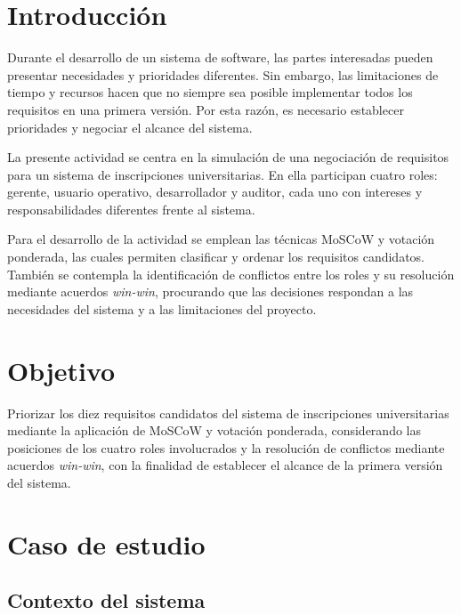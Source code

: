 \documentclass[12pt,a4paper]{article}
\begin{document}
\section{Introducción}

Durante el desarrollo de un sistema de software, las partes
interesadas pueden presentar necesidades y prioridades
diferentes. Sin embargo, las limitaciones de tiempo y recursos
hacen que no siempre sea posible implementar todos los
requisitos en una primera versión. Por esta razón, es necesario
establecer prioridades y negociar el alcance del sistema.

La presente actividad se centra en la simulación de una
negociación de requisitos para un sistema de inscripciones
universitarias. En ella participan cuatro roles: gerente,
usuario operativo, desarrollador y auditor, cada uno con
intereses y responsabilidades diferentes frente al sistema.

Para el desarrollo de la actividad se emplean las técnicas
MoSCoW y votación ponderada, las cuales permiten clasificar
y ordenar los requisitos candidatos. También se contempla
la identificación de conflictos entre los roles y su resolución
mediante acuerdos \textit{win-win}, procurando que las
decisiones respondan a las necesidades del sistema y a las
limitaciones del proyecto.


\section{Objetivo}

Priorizar los diez requisitos candidatos del sistema de
inscripciones universitarias mediante la aplicación de
MoSCoW y votación ponderada, considerando las posiciones
de los cuatro roles involucrados y la resolución de
conflictos mediante acuerdos \textit{win-win}, con la
finalidad de establecer el alcance de la primera versión
del sistema.


\section{Caso de estudio}

\subsection{Contexto del sistema}
\end{document}
